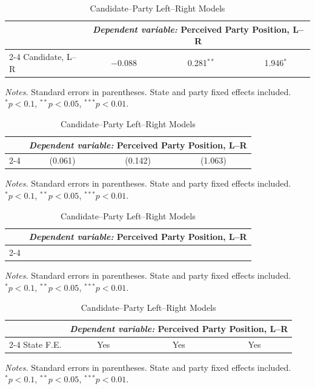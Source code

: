 \begin{table}[!htbp]\centering
\caption{Candidate--Party Left--Right Models}
\label{tab:cand_party_lr}
\begin{tabular}{lccc}
\toprule
 & \multicolumn{3}{c}{\textit{Dependent variable:} Perceived Party Position, L--R} \\
\cmidrule(lr){2-4}
 Candidate, L--R & $-$0.088 & 0.281$^{**}$ & 1.946$^{*}$ \\ \bottomrule
\end{tabular}
\vspace{0.2em}
{\footnotesize \textit{Notes.} Standard errors in parentheses. State and party fixed effects included. \\$^{*}p<0.1$, $^{**}p<0.05$, $^{***}p<0.01$.}
\end{table}

\begin{table}[!htbp]\centering
\caption{Candidate--Party Left--Right Models}
\label{tab:cand_party_lr}
\begin{tabular}{lccc}
\toprule
 & \multicolumn{3}{c}{\textit{Dependent variable:} Perceived Party Position, L--R} \\
\cmidrule(lr){2-4}
  & (0.061) & (0.142) & (1.063) \\ \bottomrule
\end{tabular}
\vspace{0.2em}
{\footnotesize \textit{Notes.} Standard errors in parentheses. State and party fixed effects included. \\$^{*}p<0.1$, $^{**}p<0.05$, $^{***}p<0.01$.}
\end{table}

\begin{table}[!htbp]\centering
\caption{Candidate--Party Left--Right Models}
\label{tab:cand_party_lr}
\begin{tabular}{lccc}
\toprule
 & \multicolumn{3}{c}{\textit{Dependent variable:} Perceived Party Position, L--R} \\
\cmidrule(lr){2-4}
 \hline \\[-1.8ex] \bottomrule
\end{tabular}
\vspace{0.2em}
{\footnotesize \textit{Notes.} Standard errors in parentheses. State and party fixed effects included. \\$^{*}p<0.1$, $^{**}p<0.05$, $^{***}p<0.01$.}
\end{table}

\begin{table}[!htbp]\centering
\caption{Candidate--Party Left--Right Models}
\label{tab:cand_party_lr}
\begin{tabular}{lccc}
\toprule
 & \multicolumn{3}{c}{\textit{Dependent variable:} Perceived Party Position, L--R} \\
\cmidrule(lr){2-4}
State F.E. & Yes & Yes & Yes \\ \bottomrule
\end{tabular}
\vspace{0.2em}
{\footnotesize \textit{Notes.} Standard errors in parentheses. State and party fixed effects included. \\$^{*}p<0.1$, $^{**}p<0.05$, $^{***}p<0.01$.}
\end{table}

